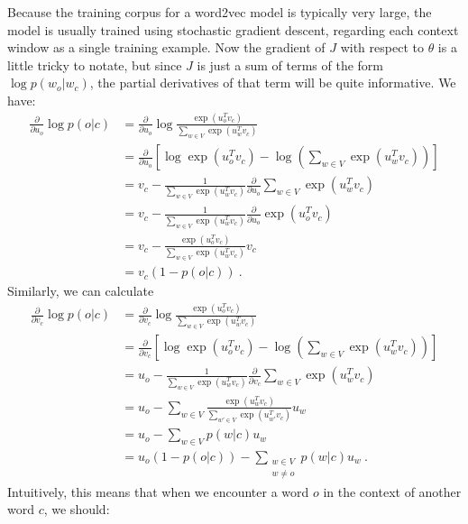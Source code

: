 Because the training corpus for a word2vec model is typically very large, the model is usually trained using stochastic gradient descent, regarding each context window as a single training example. Now the gradient of $J$ with respect to $\theta$ is a little tricky to notate, but since $J$ is just a sum of terms of the form $\log p(w_o | w_c)$, the partial derivatives of that term will be quite informative. We have:
\begin{align*}
\frac{\partial}{\partial u_o} \log p(o | c) &= \frac{\partial}{\partial u_o} \log \frac{\exp\left(u_o^T v_c\right)}{\sum_{w \in V} \exp\left(u_w^T v_c\right)} \\
&= \frac{\partial}{\partial u_o} \left[ \log \exp\left(u_o^T v_c\right) - \log \left(\sum_{w \in V} \exp \left(u_w^T v_c\right)\right) \right]\\
&= v_c - \frac{1}{\sum_{w \in V} \exp \left(u_w^T v_c\right)} \frac{\partial}{\partial u_o} \sum_{w \in V} \exp \left(u_w^T v_c\right)\\
&= v_c - \frac{1}{\sum_{w \in V} \exp \left(u_w^T v_c\right)} \frac{\partial}{\partial u_o} \exp \left(u_o^T v_c\right)\\
&= v_c - \frac{\exp \left(u_o^T v_c\right)}{\sum_{w \in V} \exp \left(u_w^T v_c\right)} v_c \\
&= v_c\left(1 - p(o | c)\right)~.
\end{align*}
Similarly, we can calculate
\begin{align*}
\frac{\partial}{\partial v_c} \log p(o | c) &= \frac{\partial}{\partial v_c} \log \frac{\exp\left(u_o^T v_c\right)}{\sum_{w \in V} \exp\left(u_w^T v_c\right)} \\
&= \frac{\partial}{\partial v_c} \left[ \log \exp\left(u_o^T v_c\right) - \log \left(\sum_{w \in V} \exp \left(u_w^T v_c\right)\right) \right]\\
&= u_o - \frac{1}{\sum_{w \in V} \exp \left(u_w^T v_c\right)} \frac{\partial}{\partial v_c} \sum_{w \in V}\exp \left(u_w^T v_c\right)\\
&= u_o - \sum_{w \in V} \frac{\exp\left(u_w^T v_c\right)}{\sum_{w' \in V} \exp\left(u_{w'}^T v_c\right)} u_w\\
&= u_o - \sum_{w \in V} p(w | c)u_w \\
&= u_o\left(1 - p(o | c)\right) - \sum_{\substack{w \in V\\ w \ne o}}p(w | c)u_w~.
\end{align*}
Intuitively, this means that when we encounter a word $o$ in the context of another word $c$, we should:
